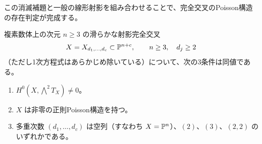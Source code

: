 この消滅補題と一般の線形射影を組み合わせることで、完全交叉のPoisson構造の存在判定が完成する。

\begin{theorem}\label{thm:ci-poisson-existence}
複素数体上の次元 $n\ge3$ の滑らかな射影完全交叉
\begin{equation}
X=X_{d_1,\ldots,d_c}\subset\mathbb P^{n+c},
\qquad n\ge3,\quad d_j\ge2
\label{eq:ci-poisson-setup}
\end{equation}
（ただし1次方程式はあらかじめ除いている）について、次の3条件は同値である。
\begin{enumerate}[label=(\arabic*)]
\item $H^0(X,\bigwedge^2T_X)\ne0$。
\item $X$ は非零の正則Poisson構造を持つ。
\item 多重次数 $(d_1,\ldots,d_c)$ は空列（すなわち $X=\mathbb P^n$）、$(2)$、$(3)$、$(2,2)$ のいずれかである。
\end{enumerate}
\end{theorem}
